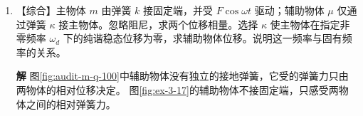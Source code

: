 \documentclass[11pt,openany,fontset=fandol]{ctexbook}
\theoremstyle{plain}\newtheorem{theorem}{定理}[chapter]\newtheorem{proposition}[theorem]{命题}
\theoremstyle{definition}\newtheorem{definition}{定义}[chapter]\newtheorem{example}{例}[chapter]
\theoremstyle{remark}\newtheorem*{remark}{说明}
\newcommand{\SolutionStart}{\par\nobreak\medskip\nobreak\noindent\textbf{解}\quad\ignorespaces}
\newenvironment{solution}{\SolutionStart}{\par\medskip}
\begin{document}
\begin{enumerate}[label=3.\arabic*]
\begin{solution}
\begin{figure}[H]\centering
{}
\caption{题3.16解图：示意取 $\beta=1$、$\alpha=1,0,-1$。正曲率单谷经过平坦四次谷变为双谷；频率由各平衡点处的曲率计算。}\label{fig:hw-3-16}
\end{figure}

当 $\alpha>0$，只有 $q_e=0$，曲率 $\alpha>0$，为稳定极小点，角频率 $\sqrt{\alpha/m}$。当 $\alpha=0$，势能为正四次函数，原点仍为严格极小点，但曲率为零，没有非零线性振动频率；有限振幅的周期必须保留四次势能计算。

当 $\alpha<0$，原点曲率为负，不稳定；另有 $q_\pm=\pm\sqrt{-\alpha/\beta}$。在两点均有 $U''(q_\pm)=\alpha-3\alpha=-2\alpha>0$，故均稳定，小振动角频率同为 $\sqrt{-2\alpha/m}$。频率应在新的平衡点展开得到，不能继续使用原点处的负曲率。

中图虽在原点形成严格极小值，切线及二阶曲率都为零；右图必须移到两个新谷底计算正曲率。
\end{solution}

\item \begin{minipage}[t]{\linewidth}
【综合】主物体 $m$ 由弹簧 $k$ 接固定端，并受 $F\cos\omega t$ 驱动；辅助物体 $\mu$ 仅通过弹簧 $\kappa$ 接主物体。忽略阻尼，求两个位移相量。选择 $\kappa$ 使主物体在指定非零频率 $\omega_d$ 下的纯谐稳态位移为零，求辅助物体位移。说明这一频率与固有频率的关系。

\end{minipage}

\begin{solution}
图\ref{fig:audit-m-q-100}中辅助物体没有独立的接地弹簧，它受的弹簧力只由两物体的相对位移决定。
图\ref{fig:ex-3-17}的辅助物体不接固定端，只感受两物体之间的相对弹簧力。


\end{solution}
\end{enumerate}
\end{document}
